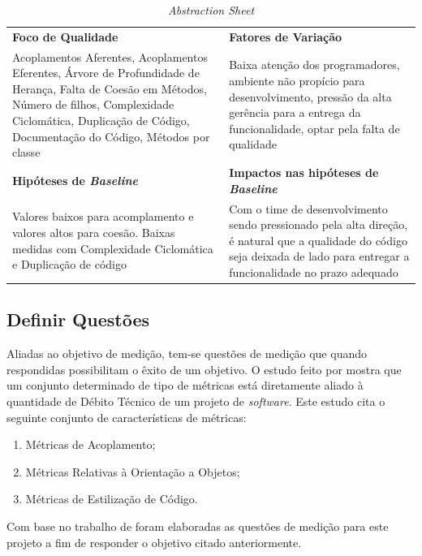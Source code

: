 \begin{table}[ht]
\caption{\textit{Abstraction Sheet}}
\centering
\begin{tabular}{p{5cm}|p{5cm}}
  \textbf{Foco de Qualidade}   & \textbf{Fatores de Variação}  \\
  Acoplamentos Aferentes, Acoplamentos Eferentes,
  Árvore de Profundidade de Herança, Falta de Coesão em Métodos, Número de filhos,
  Complexidade Ciclomática, Duplicação de Código, Documentação do Código,
  Métodos por classe
  &
  Baixa atenção dos programadores,
  ambiente não propício para desenvolvimento, pressão da alta gerência para
  a entrega da funcionalidade, optar pela falta de qualidade
  \\
\hline
\textbf{Hipóteses de \textit{Baseline}} & \textbf{Impactos nas hipóteses de \textit{Baseline}} \\

Valores baixos para acomplamento e valores altos para coesão. Baixas medidas com
Complexidade Ciclomática e Duplicação de código
&
Com o time de desenvolvimento sendo pressionado pela alta direção, é natural
que a qualidade do código seja deixada de lado para entregar a funcionalidade
no prazo adequado
\\

\end{tabular}
\label{table:abstraction}
\end{table}

\subsection{Definir Questões}
Aliadas ao objetivo de medição, tem-se questões de medição que quando respondidas
possibilitam o êxito de um objetivo. O estudo feito por \cite{oliveira} mostra que
um conjunto determinado de tipo de métricas está diretamente aliado à quantidade
de Débito Técnico de um projeto de \textit{software}. Este estudo cita o seguinte conjunto de
características de métricas:

\begin{enumerate}
  \item Métricas de Acoplamento;
  \item Métricas Relativas à Orientação a Objetos;
  \item Métricas de Estilização de Código.
\end{enumerate}

Com base no trabalho de \cite{siebra} foram elaboradas as questões de medição
para este projeto a fim de responder o objetivo citado anteriormente.

